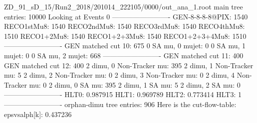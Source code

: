ZD_91_sD_15/Run2_2018/201014_222105/0000/out_ana_1.root
main tree entries: 10000
Looking at Events 0
-------------------------
GEN-8-8-8-8@PIX: 1540
RECO1stMu8: 1540
RECO2ndMu8: 1540
RECO3rdMu8: 1540
RECO4thMu8: 1510
RECO1+2Mu8: 1540
RECO1+2+3Mu8: 1540
RECO1+2+3+4Mu8: 1510
-------------------------
GEN matched cut 10: 675
0 SA mu, 0 mujet: 0
0 SA mu, 1 mujet: 0
0 SA mu, 2 mujet: 668
-------------------------
GEN matched cut 11: 400
GEN matched cut 12: 400
2 dimu, 0 Non-Tracker mu: 395
2 dimu, 1 Non-Tracker mu: 5
2 dimu, 2 Non-Tracker mu: 0
2 dimu, 3 Non-Tracker mu: 0
2 dimu, 4 Non-Tracker mu: 0
2 dimu, 0 SA mu: 395
2 dimu, 1 SA mu: 5
2 dimu, 2 SA mu: 0
-------------------------
HLT0: 0.987915
HLT1: 0.969789
HLT2: 0.773414
HLT3: 1
-------------------------
orphan-dimu tree entries: 906
Here is the cut-flow-table:
epsvsalph[k]: 0.437236
        
